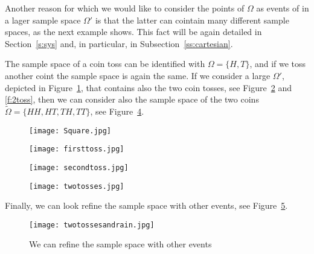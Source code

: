 	Another reason for which we would like to consider the points of $\Omega$ as events of in a lager sample space $\Omega'$ is that the latter can cointain many different sample spaces, as the next example shows. This fact will be again detailed in Section~\ref{s:sys} and, in particular, in Subsection~\ref{ss:cartesian}. 
	\begin{example}
		\label{ex:two_coin_sample}
		The sample space of a coin toss can be identified with $\Omega = \{H, T\}$, and if we toss another coint the sample space is again the same. If we consider a large $\Omega'$, depicted in Figure~\ref{f:square}, that contains also the two coin tosses, see Figure~\ref{f:1toss} and \ref{f:2toss}, then we can consider also the sample space of the two coins $\tilde \Omega = \{HH,HT,TH,TT\}$, see Figure~\ref{f:twotosses}.   

\begin{figure}[h]
\texttt{[image: Square.jpg]}
\label{f:square}
\end{figure}


\begin{figure}[h]
\texttt{[image: firsttoss.jpg]}
\label{f:1toss}
\end{figure}

		\begin{figure}[h]
\texttt{[image: secondtoss.jpg]}
\label{f2toss}
\end{figure}

\begin{figure}[h]
\texttt{[image: twotosses.jpg]}
\label{f:twotosses}
\end{figure}
		Finally, we can look refine the sample space with other events, see Figure~\ref{f:tossandrain}. 

\begin{figure}[h]
\texttt{[image: twotossesandrain.jpg]}
	\caption{ We can refine the sample space with other events \label{f:tossandrain}}
\end{figure}

	\end{example}
 

